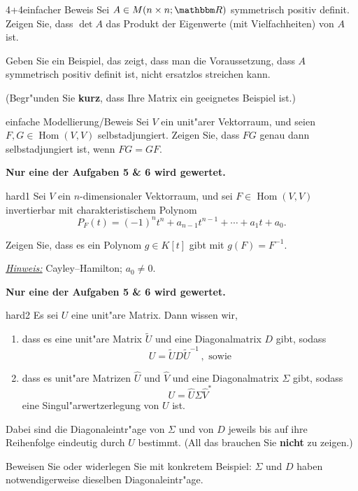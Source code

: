 \documentclass[a4paper]{article}
\DeclareMathOperator{\Hom}{Hom}
\begin{document}
\pagebreak
\begin{klaufg}{4+4}{einfacher Beweis}
Sei $A \in M(n \times n; \R)$ symmetrisch positiv
definit. Zeigen Sie, dass $\det A$ das Produkt der Eigenwerte
(mit Vielfachheiten) von $A$ ist.
\vfill

%
Geben Sie ein Beispiel, das zeigt, dass man die Voraussetzung, dass
$A$ symmetrisch positiv definit ist, nicht ersatzlos streichen kann.

(Begr"unden Sie {\bfseries\sffamily kurz}, dass Ihre Matrix ein
geeignetes Beispiel ist.)
\vfill

\end{klaufg}

\pagebreak
\begin{klaufg}{8}{einfache Modellierung/Beweis}
  Sei $V$ ein unit"arer Vektorraum, und seien $F,G \in
  \Hom(V,V)$ selbstadjungiert. Zeigen Sie, dass $FG$ genau dann
  selbstadjungiert ist, wenn $FG=GF$.
\end{klaufg}
 
\pagebreak
{\bfseries Nur eine der Aufgaben 5 \& 6 wird gewertet.}
\bigskip
\bigskip

\begin{klaufg}{8}{hard1}
   Sei $V$ ein $n$-dimensionaler Vektorraum, und sei $F \in
   \operatorname{Hom}(V,V)$ invertierbar mit charakteristischem
   Polynom $$P_F(t) = (-1)^n t^n + a_{n-1} t^{n-1} + \cdots + a_1 t +
   a_0 .$$

   Zeigen Sie, dass es ein Polynom $g \in K[t]$ gibt mit $g(F)= F^{-1}$.
   \medskip

   \underline{\emph{Hinweis:}} Cayley--Hamilton; $a_0 \neq 0$.  
\end{klaufg}

\pagebreak
{\bfseries Nur eine der Aufgaben 5 \& 6 wird gewertet.}
\bigskip
\bigskip

\begin{klaufg}{8}{hard2}
  Es sei $U$ eine unit"are Matrix. Dann wissen wir, 
  \begin{enumerate}
  \item dass es eine unit"are Matrix $\tilde{U}$ und eine Diagonalmatrix
    $D$ gibt, sodass
    \[ U = \tilde{U} D \tilde{U}^{-1}\,, \text{ sowie}
    \]
  \item dass
    es unit"are Matrizen $\widehat{U}$ und $\widehat{V}$ und eine
    Diagonalmatrix $\Sigma$ gibt, sodass
    \[ U = \widehat{U} \Sigma \widehat{V}^*
    \]
    eine Singul"arwertzerlegung von $U$ ist.
  \end{enumerate}
  Dabei sind die Diagonaleintr"age von $\Sigma$ und von $D$ jeweils
  bis auf ihre Reihenfolge eindeutig durch $U$ bestimmt. (All das
  brauchen Sie {\bfseries nicht} zu zeigen.)

  Beweisen Sie oder widerlegen Sie mit konkretem Beispiel: $\Sigma$ und
  $D$ haben notwendigerweise dieselben Diagonaleintr"age.
\end{klaufg}
\end{document}
